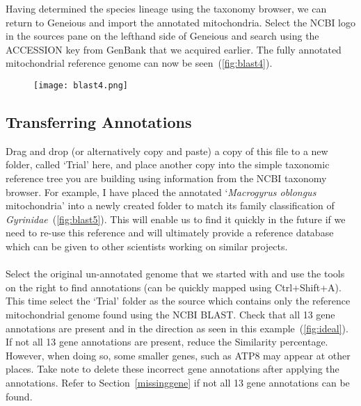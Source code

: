 \documentclass[11pt]{article}
\begin{document}
Having determined the species lineage using the taxonomy browser, we can return to Geneious and import the annotated mitochondria. Select the NCBI logo in the sources pane on the lefthand side of Geneious and search using the ACCESSION key from GenBank that we acquired earlier. The fully annotated mitochondrial reference genome can now be seen~(\autoref{fig:blast4}).

\begin{figure}[H]
  \centering
    \texttt{[image: blast4.png]}
  \label{fig:blast4}
\end{figure}



\subsection{Transferring Annotations}
\label{subsec:Transferring}
Drag and drop (or alternatively copy and paste) a copy of this file to a new folder, called `Trial' here, and place another copy into the simple taxonomic reference tree you are building using information from the NCBI taxonomy browser. For example, I have placed the annotated `\textit{Macrogyrus oblongus} mitochondria' into a newly created folder to match its family classification of \textit{Gyrinidae}~(\autoref{fig:blast5}). This will enable us to find it quickly in the future if we need to re-use this reference and will ultimately provide a reference database which can be given to other scientists working on similar projects.
\\
\\
Select the original un-annotated genome that we started with and use the tools on the right to find annotations (can be quickly mapped using Ctrl+Shift+A). This time select the `Trial' folder as the source which contains only the reference mitochondrial genome found using the NCBI BLAST. Check that all 13 gene annotations are present and in the direction as seen in this example~(\autoref{fig:ideal}). If not all 13 gene annotations are present, reduce the Similarity percentage. However, when doing so, some smaller genes, such as ATP8 may appear at other places. Take note to delete these incorrect gene annotations after applying the annotations. Refer to Section~\ref{missinggene} if not all 13 gene annotations can be found. 
\end{document}
